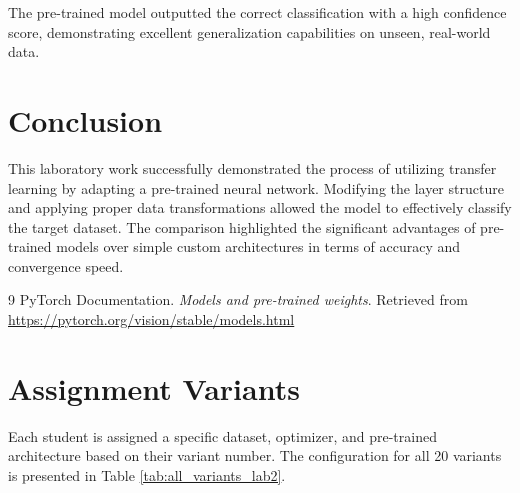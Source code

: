 \documentclass[12pt, a4paper]{article}
\begin{document}
The pre-trained model outputted the correct classification with a high confidence score, demonstrating excellent generalization capabilities on unseen, real-world data.

\section{Conclusion}
This laboratory work successfully demonstrated the process of utilizing transfer learning by adapting a pre-trained neural network. Modifying the layer structure and applying proper data transformations allowed the model to effectively classify the target dataset. The comparison highlighted the significant advantages of pre-trained models over simple custom architectures in terms of accuracy and convergence speed.

\vspace{1cm}
\begin{thebibliography}{9}
    PyTorch Documentation. \textit{Models and pre-trained weights}. Retrieved from \url{https://pytorch.org/vision/stable/models.html}
\end{thebibliography}

\newpage
\appendix
\section{Assignment Variants}
Each student is assigned a specific dataset, optimizer, and pre-trained architecture based on their variant number. The configuration for all 20 variants is presented in Table \ref{tab:all_variants_lab2}.
\end{document}
